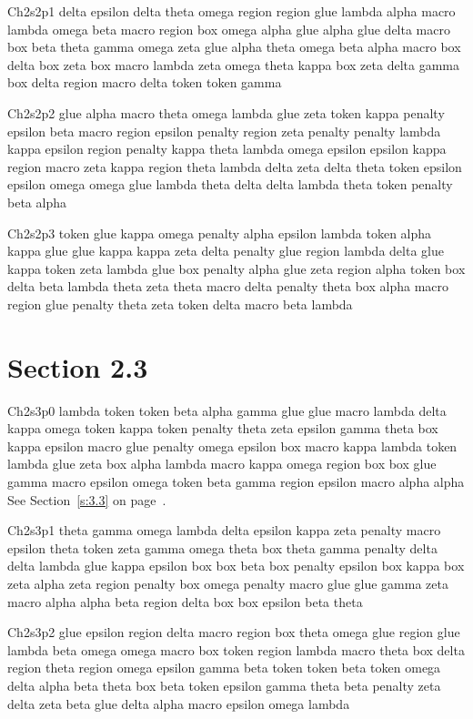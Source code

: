 Ch2s2p1 delta epsilon delta theta omega region region glue lambda alpha macro lambda omega beta macro region box omega alpha glue alpha glue delta macro box beta theta gamma omega zeta glue alpha theta omega beta alpha macro box delta box zeta box macro lambda zeta omega theta kappa box zeta delta gamma box delta region macro delta token token gamma

Ch2s2p2 glue alpha macro theta omega lambda glue zeta token kappa penalty epsilon beta macro region epsilon penalty region zeta penalty penalty lambda kappa epsilon region penalty kappa theta lambda omega epsilon epsilon kappa region macro zeta kappa region theta lambda delta zeta delta theta token epsilon epsilon omega omega glue lambda theta delta delta lambda theta token penalty beta alpha

Ch2s2p3 token glue kappa omega penalty alpha epsilon lambda token alpha kappa glue glue kappa kappa zeta delta penalty glue region lambda delta glue kappa token zeta lambda glue box penalty alpha glue zeta region alpha token box delta beta lambda theta zeta theta macro delta penalty theta box alpha macro region glue penalty theta zeta token delta macro beta lambda

\section{Section 2.3}\label{s:2.3}
Ch2s3p0 lambda token token beta alpha gamma glue glue macro lambda delta kappa omega token kappa token penalty theta zeta epsilon gamma theta box kappa epsilon macro glue penalty omega epsilon box macro kappa lambda token lambda glue zeta box alpha lambda macro kappa omega region box box glue gamma macro epsilon omega token beta gamma region epsilon macro alpha alpha See Section~\ref{s:3.3} on page~\pageref{s:3.3}.

Ch2s3p1 theta gamma omega lambda delta epsilon kappa zeta penalty macro epsilon theta token zeta gamma omega theta box theta gamma penalty delta delta lambda glue kappa epsilon box box beta box penalty epsilon box kappa box zeta alpha zeta region penalty box omega penalty macro glue glue gamma zeta macro alpha alpha beta region delta box box epsilon beta theta

Ch2s3p2 glue epsilon region delta macro region box theta omega glue region glue lambda beta omega omega macro box token region lambda macro theta box delta region theta region omega epsilon gamma beta token token beta token omega delta alpha beta theta box beta token epsilon gamma theta beta penalty zeta delta zeta beta glue delta alpha macro epsilon omega lambda

